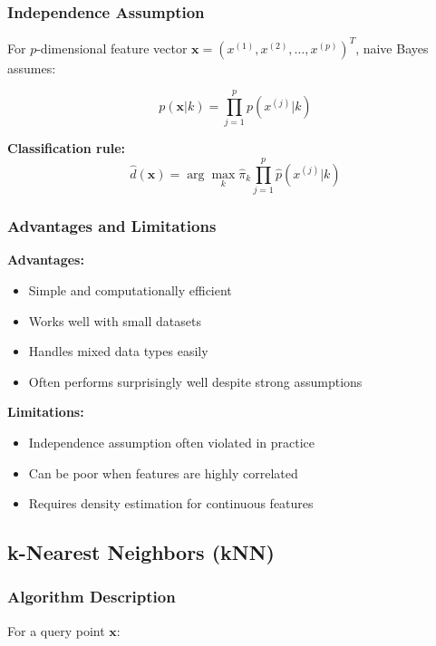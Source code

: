 \documentclass[12pt,a4paper]{article}
\begin{document}
\subsubsection{Independence Assumption}

For $p$-dimensional feature vector $\mathbf{x} = (x^{(1)}, x^{(2)}, \ldots, x^{(p)})^T$, naive Bayes assumes:

\begin{equation}
p(\mathbf{x}|k) = \prod_{j=1}^p p(x^{(j)}|k)
\end{equation}

\textbf{Classification rule:}
\begin{equation}
\hat{d}(\mathbf{x}) = \arg\max_k \hat{\pi}_k \prod_{j=1}^p \hat{p}(x^{(j)}|k)
\end{equation}

\subsubsection{Advantages and Limitations}

\textbf{Advantages:}
\begin{itemize}
    \item Simple and computationally efficient
    \item Works well with small datasets
    \item Handles mixed data types easily
    \item Often performs surprisingly well despite strong assumptions
\end{itemize}

\textbf{Limitations:}
\begin{itemize}
    \item Independence assumption often violated in practice
    \item Can be poor when features are highly correlated
    \item Requires density estimation for continuous features
\end{itemize}

\subsection{k-Nearest Neighbors (kNN)}

\subsubsection{Algorithm Description}

For a query point $\mathbf{x}$:
\end{document}

